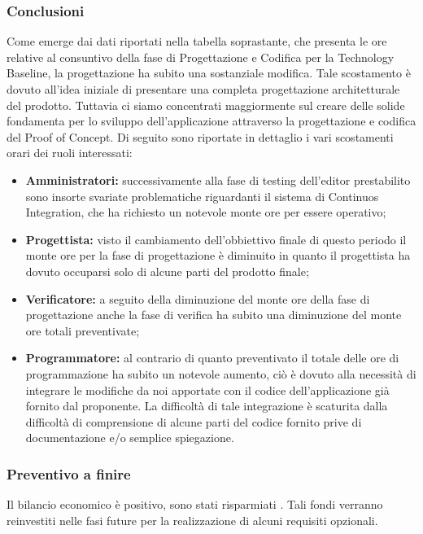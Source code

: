 \subsubsection{Conclusioni}
Come emerge dai dati riportati nella tabella soprastante, che presenta le ore relative al consuntivo della fase di Progettazione e Codifica per la Technology Baseline, la progettazione ha subito una sostanziale modifica. Tale scostamento è dovuto all'idea iniziale di presentare una completa progettazione architetturale del prodotto. Tuttavia ci siamo concentrati maggiormente sul creare delle solide fondamenta per lo sviluppo dell'applicazione attraverso la progettazione e codifica del Proof of Concept\glo. Di seguito sono riportate in dettaglio i vari scostamenti orari dei ruoli interessati:
\begin{itemize}
\item \textbf{Amministratori:} successivamente alla fase di testing dell'editor prestabilito sono insorte svariate problematiche riguardanti il sistema di Continuos Integration\glosp, che ha richiesto un notevole monte ore per essere operativo;
\item \textbf{Progettista:} visto il cambiamento dell'obbiettivo finale di questo periodo il monte ore per la fase di progettazione è diminuito in quanto il progettista ha dovuto occuparsi solo di alcune parti del prodotto finale; 
\item \textbf{Verificatore:} a seguito della diminuzione del monte ore della fase di progettazione anche la fase di verifica ha subito una diminuzione del monte ore totali preventivate;
\item \textbf{Programmatore:} al contrario di quanto preventivato il totale delle ore di programmazione ha subito un notevole aumento, ciò è dovuto alla necessità di integrare le modifiche da noi apportate con il codice dell'applicazione già fornito dal proponente. La difficoltà di tale integrazione è scaturita dalla difficoltà di comprensione di alcune parti del codice fornito prive di documentazione e/o semplice spiegazione.
\end{itemize}

\subsubsection{Preventivo a finire}
Il bilancio economico è positivo, sono stati risparmiati . Tali fondi verranno reinvestiti nelle fasi future per la realizzazione di alcuni requisiti opzionali.
